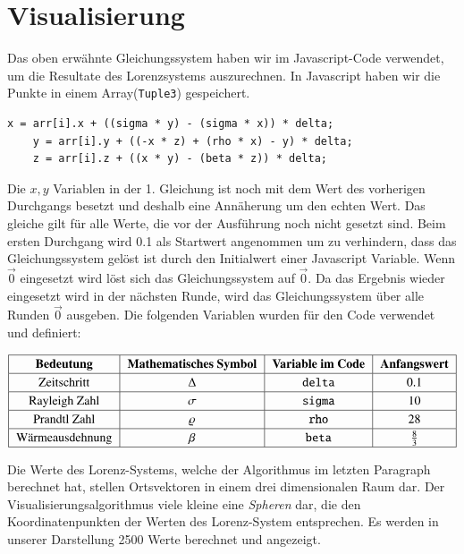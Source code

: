 
\section{Visualisierung}
Das oben erwähnte Gleichungssystem haben wir im Javascript-Code verwendet, um die Resultate des Lorenzsystems auszurechnen. In Javascript haben wir die Punkte in einem Array(\texttt{Tuple3}) gespeichert.

	\begin{lstlisting}[style=C]
	x = arr[i].x + ((sigma * y) - (sigma * x)) * delta;
	y = arr[i].y + ((-x * z) + (rho * x) - y) * delta;
	z = arr[i].z + ((x * y) - (beta * z)) * delta;
	\end{lstlisting}

Die $ x, y $ Variablen in der 1. Gleichung ist noch mit dem Wert des vorherigen Durchgangs besetzt und deshalb eine Annäherung um den echten Wert. Das gleiche gilt für alle Werte, die vor der Ausführung noch nicht gesetzt sind. 
Beim ersten Durchgang wird 0.1 als Startwert angenommen um zu verhindern, dass das Gleichungssystem gelöst ist durch den Initialwert einer Javascript Variable. Wenn $ \vec{0} $ eingesetzt wird löst sich das Gleichungssystem auf $ \vec{0} $. Da das Ergebnis wieder eingesetzt wird in der nächsten Runde, wird das Gleichungssystem über alle Runden $ \vec{0} $ ausgeben.
Die folgenden Variablen wurden für den Code verwendet und definiert:

\begin{align}
{\renewcommand{\arraystretch}{1.2}
	\begin{tabular}{| c | c | c | c |}
		\hline
		\textbf{Bedeutung} & \textbf{Mathematisches Symbol} & \textbf{Variable im Code} & \textbf{Anfangswert}\\\hline
		Zeitschritt & $ \Delta $ & \texttt{delta} & 0.1 \\\hline
		Rayleigh Zahl & $ \sigma $ & \texttt{sigma} & 10 \\\hline
		Prandtl Zahl & $\varrho $ & \texttt{rho} & 28 \\\hline
		Wärmeausdehnung & $\beta $ & \texttt{beta}  & $ \frac{8}{3} $ \\\hline
	\end{tabular}
}
\end{align}

Die Werte des Lorenz-Systems, welche der Algorithmus im letzten Paragraph berechnet hat, stellen Ortsvektoren in einem drei dimensionalen Raum dar. Der Visualisierungsalgorithmus viele kleine eine \textit{Spheren} dar, die den Koordinatenpunkten der Werten des Lorenz-System entsprechen. Es werden in unserer Darstellung 2500 Werte berechnet und angezeigt.

